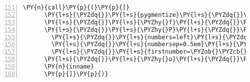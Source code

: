 \begin{Verbatim}[commandchars=\\\{\},numbers=left,numbersep=0.5em,firstnumber=151]
    \PY{n}{call}\PY{p}{(}\PY{p}{[}
      \PY{l+s}{\PYZdq{}}\PY{l+s}{pygmentize}\PY{l+s}{\PYZdq{}}\PY{p}{,} 
      \PY{l+s}{\PYZdq{}}\PY{l+s}{\PYZhy{}f}\PY{l+s}{\PYZdq{}}\PY{p}{,} \PY{l+s}{\PYZdq{}}\PY{l+s}{tex}\PY{l+s}{\PYZdq{}}\PY{p}{,} 
      \PY{l+s}{\PYZdq{}}\PY{l+s}{\PYZhy{}P}\PY{l+s}{\PYZdq{}}\PY{p}{,} \PY{l+s}{\PYZdq{}}\PY{l+s}{verboptions=\PYZob{}\PYZcb{},\PYZob{}\PYZcb{},\PYZob{}\PYZcb{}}\PY{l+s}{\PYZdq{}}\PY{o}{.}\PY{n}{format}\PY{p}{(}
        \PY{l+s}{\PYZdq{}}\PY{l+s}{numbers=left}\PY{l+s}{\PYZdq{}}\PY{p}{,} 
        \PY{l+s}{\PYZdq{}}\PY{l+s}{numbersep=0.5em}\PY{l+s}{\PYZdq{}}\PY{p}{,}
        \PY{l+s}{\PYZdq{}}\PY{l+s}{firstnumber=\PYZob{}\PYZcb{}}\PY{l+s}{\PYZdq{}}\PY{o}{.}\PY{n}{format}\PY{p}{(}\PY{n}{i}\PY{p}{)}\PY{p}{)}\PY{p}{,}
      \PY{l+s}{\PYZdq{}}\PY{l+s}{\PYZhy{}o}\PY{l+s}{\PYZdq{}}\PY{p}{,} \PY{n}{os}\PY{o}{.}\PY{n}{path}\PY{o}{.}\PY{n}{join}\PY{p}{(}\PY{n}{snipdir}\PY{p}{,} \PY{n}{sname} \PY{o}{+} \PY{l+s}{\PYZdq{}}\PY{l+s}{.tex}\PY{l+s}{\PYZdq{}}\PY{p}{)}\PY{p}{,}
      \PY{n}{inname}
      \PY{p}{]}\PY{p}{)}
\end{Verbatim}
